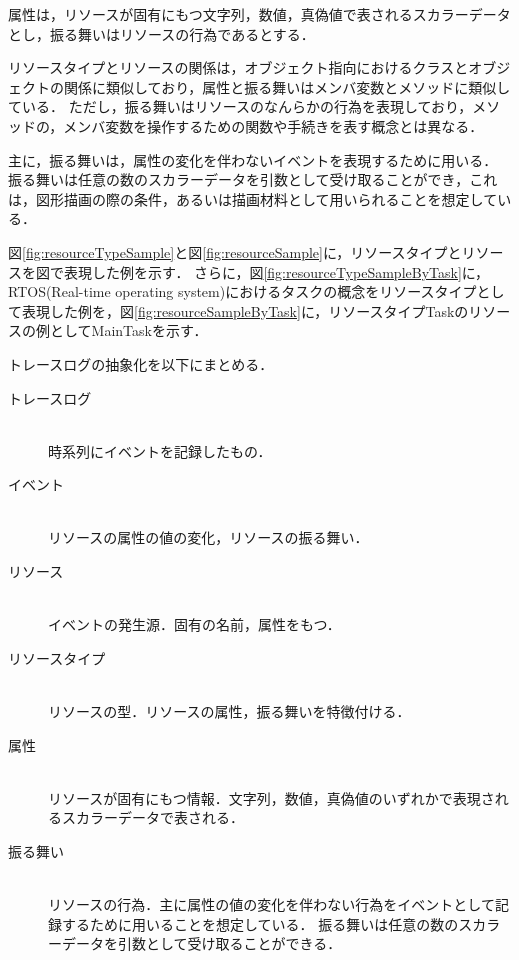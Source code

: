 属性は，リソースが固有にもつ文字列，数値，真偽値で表されるスカラーデータとし，振る舞いはリソースの行為であるとする．

リソースタイプとリソースの関係は，オブジェクト指向におけるクラスとオブジェクトの関係に類似しており，属性と振る舞いはメンバ変数とメソッドに類似している．
ただし，振る舞いはリソースのなんらかの行為を表現しており，メソッドの，メンバ変数を操作するための関数や手続きを表す概念とは異なる．

主に，振る舞いは，属性の変化を伴わないイベントを表現するために用いる．
振る舞いは任意の数のスカラーデータを引数として受け取ることができ，これは，図形描画の際の条件，あるいは描画材料として用いられることを想定している．

図\ref{fig:resourceTypeSample}と図\ref{fig:resourceSample}に，リソースタイプとリソースを図で表現した例を示す．
さらに，図\ref{fig:resourceTypeSampleByTask}に，RTOS(Real-time operating system)におけるタスクの概念をリソースタイプとして表現した例を，図\ref{fig:resourceSampleByTask}に，リソースタイプTaskのリソースの例としてMainTaskを示す．

トレースログの抽象化を以下にまとめる．

\begin{description}
\item[トレースログ] \mbox{} \\
時系列にイベントを記録したもの．
\item[イベント] \mbox{} \\
リソースの属性の値の変化，リソースの振る舞い．
\item[リソース] \mbox{} \\
イベントの発生源．固有の名前，属性をもつ．
\item[リソースタイプ] \mbox{} \\
リソースの型．リソースの属性，振る舞いを特徴付ける．
\item[属性] \mbox{} \\
リソースが固有にもつ情報．文字列，数値，真偽値のいずれかで表現されるスカラーデータで表される．
\item[振る舞い] \mbox{} \\
リソースの行為．主に属性の値の変化を伴わない行為をイベントとして記録するために用いることを想定している．
振る舞いは任意の数のスカラーデータを引数として受け取ることができる．
\end{description}


